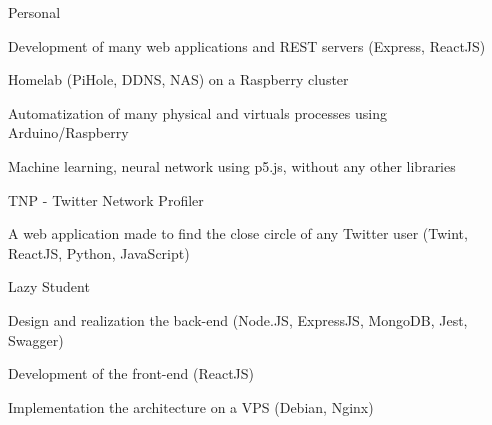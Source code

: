 
\begin{cventries}
  \cventry
    {} %
    {Personal} %
    {} %
    {} %
    {
      \begin{cvitems} %
        \item {Development of many web applications and REST servers (Express, ReactJS)}
        \item {Homelab (PiHole, DDNS, NAS) on a Raspberry cluster}
		\item {Automatization of many physical and virtuals processes using Arduino/Raspberry}
        \item {Machine learning, neural network using p5.js, without any other libraries}
      \end{cvitems}
    }

  \cventry
    {} %
    {TNP - Twitter Network Profiler} %
    {} %
    {} %
    {
      \begin{cvitems} %
      	\item {A web application made to find the close circle of any Twitter user (Twint, ReactJS, Python, JavaScript)}
      \end{cvitems}
    }

  \cventry
    {} %
    {Lazy Student} %
    {} %
    {} %
    {
      \begin{cvitems} %
      	\item {Design and realization the back-end (Node.JS, ExpressJS, MongoDB, Jest, Swagger)}
		\item {Development of the front-end (ReactJS)}
		\item {Implementation the architecture on a VPS (Debian, Nginx)}
      \end{cvitems}
    }
\end{cventries}